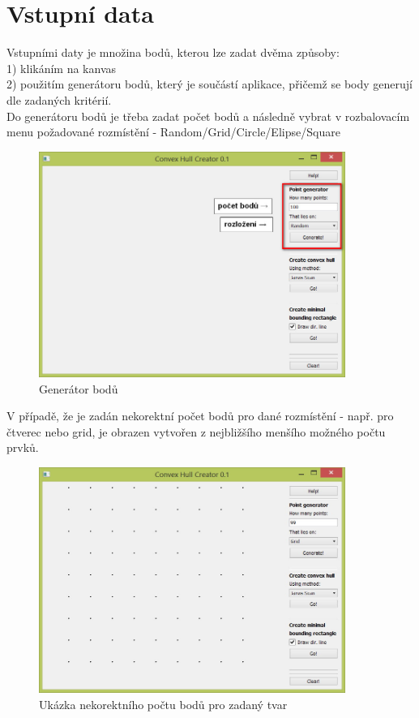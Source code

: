 \documentclass[a4paper, 12pt]{article}
\begin{document}
\section{Vstupní data}

Vstupními daty je množina bodů, kterou lze zadat dvěma způsoby:\\
1) klikáním na kanvas\\
2) použitím generátoru bodů, který je součástí aplikace, přičemž se body generují dle zadaných kritérií.\\


 Do generátoru bodů je třeba zadat počet bodů a následně vybrat v rozbalovacím menu 
 požadované rozmístění - Random/Grid/Circle/Elipse/Square 

\begin{figure}[h]
	\centering
	\includegraphics[width=10cm]{vstup_nastaveni.jpg}
	\caption{Generátor bodů}
\end{figure}
 
V případě, že je zadán nekorektní počet bodů pro dané rozmístění - např. pro čtverec nebo grid, je obrazen vytvořen z nejbližšího menšího možného počtu prvků.

\begin{figure}[h]
	\centering
	\includegraphics[width=10cm]{vstup.jpg}
	\caption{Ukázka nekorektního počtu bodů pro zadaný tvar}
\end{figure}
 
\end{document}
